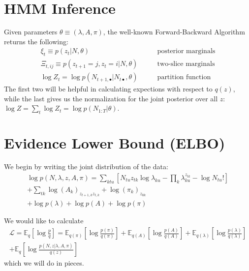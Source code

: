 \documentclass[11pt]{article}
\begin{document}
\section{HMM Inference}
Given parameters $\theta \equiv (\lambda, A, \pi)$, the well-known Forward-Backward Algorithm returns the following:
\begin{align}
    \xi_{t} \equiv p(z_{t}|N, \theta) \qquad &\text{posterior marginals}\\
    \Xi_{t, ij} \equiv p(z_{t+1} = j, z_{t} = i|N, \theta) \qquad &\text{two-slice marginals}\\
    \log Z_{t} = \log p(N_{t+1, \bullet}|N_{t\bullet}, \theta) \qquad &\text{partition function}
\end{align}
The first two will be helpful in calculating expections with respect to $q(z)$, while the last gives us the normalization for the joint posterior over all $z$: $\log Z = \sum_t \log Z_{t} = \log p(N_{1:T}|\theta)$.

\section{Evidence Lower Bound (ELBO)}
We begin by writing the joint distribution of the data:
\begin{multline}
    \log p(N, \lambda, z, A,\pi) = \sum_{ktu}\left[ N_{tu} z_{tk} \log \lambda_{ku} - \prod_k \lambda_{ku}^{z_{tk}} - \log N_{tu}!\right] \\
    + \sum_{tk} \log (A_k)_{z_{t+1, k} z_{t, k}} + \log (\pi_k)_{z_{0k}} \\
    + \log p(\lambda) + \log p(A) + \log p(\pi)
\end{multline}

We would like to calculate
\begin{multline}
    \mathcal{L} = \mathbb{E}_q\left[\log \frac{p}{q}\right] = \mathbb{E}_{q(\pi)} \left[\log \frac{p(\pi)}{q(\pi)} \right] + \mathbb{E}_{q(A)} \left[\log \frac{p(A)}{q(A)} \right] + \mathbb{E}_{q(\lambda)} \left[\log \frac{p(\lambda)}{q(\lambda)} \right] \\ + \mathbb{E}_{q}\left[ \log \frac{p(N, z|\lambda, A, \pi)}{q(z)}\right]
\end{multline}
which we will do in pieces.
\end{document}
